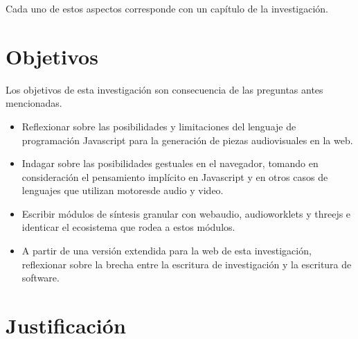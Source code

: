 Cada uno de estos aspectos corresponde con un capítulo de la investigación. 


\section{Objetivos}

Los objetivos de esta investigación son consecuencia de las preguntas antes mencionadas. 

\begin{itemize}
\item Reflexionar sobre las posibilidades y limitaciones del lenguaje de programación Javascript para la generación de piezas audiovisuales en la web.
\item Indagar sobre las posibilidades gestuales en el navegador, tomando en consideración el pensamiento implícito en Javascript y en otros casos de lenguajes que utilizan motoresde audio y video.
\item Escribir módulos de síntesis granular con \Gls{webaudio}, \Gls{audioworklets} y \Gls{threejs} e identicar el ecosistema que rodea a estos módulos.
\item A partir de una versión extendida para la web de esta investigación, reflexionar sobre la brecha entre la escritura de investigación y la escritura de software. 
\end{itemize}


\section{Justificación} %

